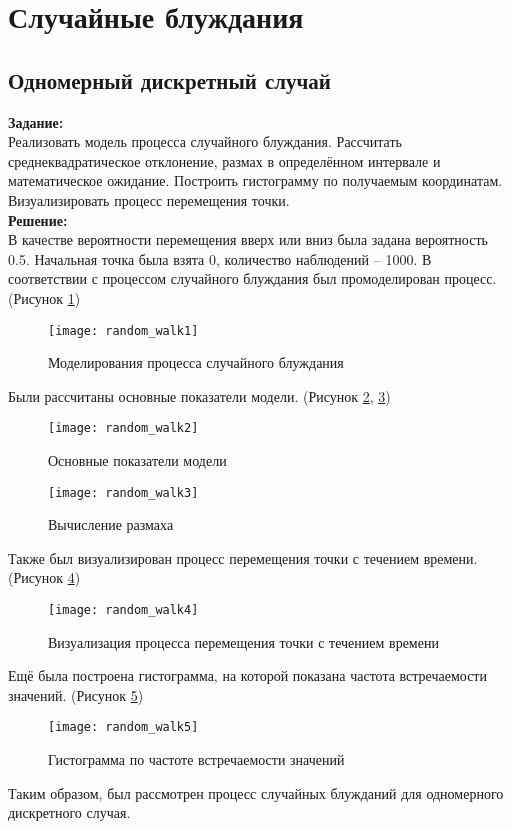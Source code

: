 \section*{Случайные блуждания}
\subsection*{Одномерный дискретный случай}

\textbf{Задание:}\\
Реализовать модель процесса случайного блуждания. Рассчитать среднеквадратическое отклонение, размах в определённом интервале и математическое ожидание. Построить гистограмму по получаемым координатам. Визуализировать процесс перемещения точки.\\

\textbf{Решение:}\\
В качестве вероятности перемещения вверх или вниз была задана вероятность 0.5. Начальная точка была взята 0, количество наблюдений -- 1000. В соответствии с процессом случайного блуждания был промоделирован процесс. (Рисунок \ref{fig:random_walk1})
\begin{figure}[h]
	\centering \texttt{[image: random\_walk1]}
	\caption{Моделирования процесса случайного блуждания}
	\label{fig:random_walk1}
\end{figure}

Были рассчитаны основные показатели модели. (Рисунок \ref{fig:random_walk2},  \ref{fig:random_walk3})
\begin{figure}[h]
	\centering \texttt{[image: random\_walk2]}
	\caption{Основные показатели модели}
	\label{fig:random_walk2}
\end{figure}

\newpage

\begin{figure}[h]
	\centering \texttt{[image: random\_walk3]}
	\caption{Вычисление размаха}
	\label{fig:random_walk3}
\end{figure}

Также был визуализирован процесс перемещения точки с течением времени. (Рисунок \ref{fig:random_walk4})
\begin{figure}[h]
	\centering \texttt{[image: random\_walk4]}
	\caption{Визуализация процесса перемещения точки с течением времени}
	\label{fig:random_walk4}
\end{figure}

\newpage

Ещё была построена гистограмма, на которой показана частота встречаемости значений. (Рисунок \ref{fig:random_walk5})

\begin{figure}[h]
	\centering \texttt{[image: random\_walk5]}
	\caption{Гистограмма по частоте встречаемости значений}
	\label{fig:random_walk5}
\end{figure}

Таким образом, был рассмотрен процесс случайных блужданий для одномерного дискретного случая.